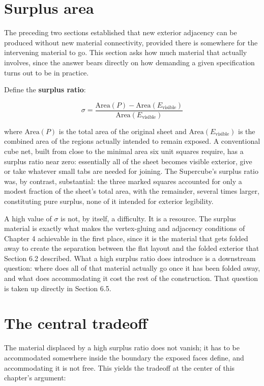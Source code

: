 \documentclass[11pt,oneside]{book}
\begin{document}
\hypertarget{surplus-area}{%
\section{Surplus area}\label{surplus-area}}

The preceding two sections established that new exterior adjacency can
be produced without new material connectivity, provided there is
somewhere for the intervening material to go. This section asks how much
material that actually involves, since the answer bears directly on how
demanding a given specification turns out to be in practice.

Define the \textbf{surplus ratio}:

\[\sigma = \frac{\text{Area}(P) - \text{Area}(E_{\text{visible}})}{\text{Area}(E_{\text{visible}})}\]

where \(\text{Area}(P)\) is the total area of the original sheet and
\(\text{Area}(E_{\text{visible}})\) is the combined area of the regions
actually intended to remain exposed. A conventional cube net, built from
close to the minimal area six unit squares require, has a surplus ratio
near zero: essentially all of the sheet becomes visible exterior, give
or take whatever small tabs are needed for joining. The Supercube's
surplus ratio was, by contrast, substantial: the three marked squares
accounted for only a modest fraction of the sheet's total area, with the
remainder, several times larger, constituting pure surplus, none of it
intended for exterior legibility.

A high value of \(\sigma\) is not, by itself, a difficulty. It is a
resource. The surplus material is exactly what makes the vertex-gluing
and adjacency conditions of Chapter 4 achievable in the first place,
since it is the material that gets folded away to create the separation
between the flat layout and the folded exterior that Section 6.2
described. What a high surplus ratio does introduce is a downstream
question: where does all of that material actually go once it has been
folded away, and what does accommodating it cost the rest of the
construction. That question is taken up directly in Section 6.5.

\hypertarget{the-central-tradeoff}{%
\section{The central tradeoff}\label{the-central-tradeoff}}

The material displaced by a high surplus ratio does not vanish; it has
to be accommodated somewhere inside the boundary the exposed faces
define, and accommodating it is not free. This yields the tradeoff at
the center of this chapter's argument:
\end{document}
